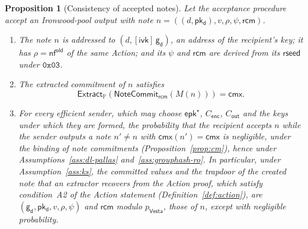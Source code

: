 \documentclass[11pt,a4paper]{article}
\newtheorem{proposition}[theorem]{Proposition}
\theoremstyle{definition}
\newcommand{\PP}{\mathbb{P}}
\newcommand{\nfsym}{\mathsf{nf}}
\newcommand{\cmx}{\mathsf{cmx}}
\newcommand{\Vesta}{\ensuremath{\mathsf{Vesta}}}
\newcommand{\NoteCommit}{\ensuremath{\mathsf{NoteCommit}}}
\newcommand{\Extract}{\ensuremath{\mathsf{Extract}}}
\newcommand{\ivk}{\ensuremath{\mathsf{ivk}}}
\newcommand{\pkd}{\ensuremath{\mathsf{pk_d}}}
\newcommand{\gd}{\ensuremath{\mathsf{g_d}}}
\newcommand{\rcm}{\ensuremath{\mathsf{rcm}}}
\begin{document}
\begin{proposition}[Consistency of accepted notes]\label{prop:accept}
Let the acceptance procedure accept an Ironwood-pool output with note
$n = ((d, \pkd), v, \rho, \psi, \rcm)$.
\begin{enumerate}
\item[(a)] The note $n$ is addressed to $(d, [\ivk]\,\gd)$, an address of the
  recipient's key; it has $\rho = \nfsym^{\mathsf{old}}$ of the same Action;
  and its $\psi$ and $\rcm$ are derived from its $\mathsf{rseed}$ under
  $\mathtt{0x03}$.
\item[(b)] The extracted commitment of $n$ satisfies
  \[
    \Extract_{\PP}(\NoteCommit_{\rcm}(M(n))) = \cmx.
  \]
\item[(c)] For every efficient sender, which may choose
  $\mathsf{epk}^{\star}$, $C_{\mathsf{enc}}$, $C_{\mathsf{out}}$ and the
  keys under which they are formed, the probability that the recipient
  accepts $n$ while the sender outputs a note $n' \neq n$ with
  $\cmx(n') = \cmx$ is negligible, under the binding of note commitments
  (Proposition~\ref{prop:cm}), hence under Assumptions~\ref{ass:dl-pallas}
  and~\ref{ass:grouphash-ro}. In particular, under Assumption~\ref{ass:ks},
  the committed values and the trapdoor of the created note that an
  extractor recovers from the Action proof, which satisfy condition~A2 of
  the Action statement (Definition~\ref{def:action}), are
  $(\gd, \pkd, v, \rho, \psi)$ and $\rcm$ modulo $p_{\Vesta}$, those of $n$,
  except with negligible probability.
\end{enumerate}
\end{proposition}
\end{document}
